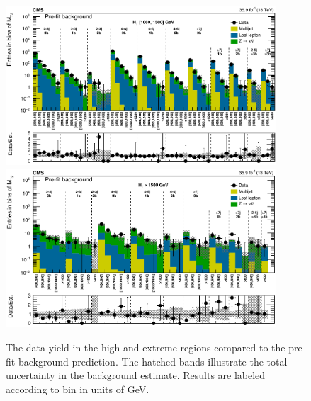 \begin{figure}
	\centering
	\includegraphics[width=0.90\textwidth]{results/figs/mt2_highHT_fullEstimate}
	\includegraphics[width=0.90\textwidth]{results/figs/mt2_extremeHT_fullEstimate}
	\caption{The data yield in the high \HT and extreme \HT regions compared to the pre-fit background prediction. The hatched bands illustrate the total uncertainty in the background estimate. Results are labeled according to \mttwo bin in units of GeV.}
	\label{fig:yieldPrefit3}
\end{figure}


